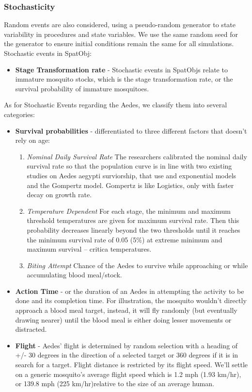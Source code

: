 \subsubsection{Stochasticity}
    Random events are also considered, using a pseudo-random generator to state variability in procedures and state variables. We use the same random seed for the generator to ensure initial conditions remain the same for all simulations.
Stochastic events in SpatObj:
\begin{itemize}

\item \textbf{Stage Transformation rate} - Stochastic events in SpatObjs relate to immature mosquito stocks, which is the stage transformation rate, or the survival probability of immature mosquitoes.

\end{itemize}
As for Stochastic Events regarding the Aedes, we classify them into several categories:
\begin{itemize}

\item \textbf{Survival probabilities} - differentiated to three different factors that doesn't rely on age:
\begin{enumerate}
		\item \textit{Nominal Daily Survival Rate}
			The researchers calibrated the nominal daily survival rate so that the population curve is in line with two existing studies on Aedes aegypti surviorship, that use and exponential models and the Gompertz model\cite{yang}. Gompertz is like Logistics, only with faster decay on growth rate. 
			
		\item \textit{Temperature Dependent} 
             For each stage, the minimum and maximum threshold temperatures are given for maximum survival rate. Then this probability decreases linearly beyond the two thresholds until it reaches the minimum survival rate of 0.05 (5\%) at extreme minimum and maximum survival – critica temperatures\cite{skeeter}.
        
		\item \textit{Biting Attempt}
			Chance of the Aedes to survive while approaching or while accumulating blood meal/stock.
\end{enumerate}

	\item \textbf{Action Time} - or the duration of an Aedes in attempting the activity to be done and its completion time. For illustration, the mosquito wouldn't directly approach a blood meal target, instead, it will fly randomly (but eventually drawing nearer) until the blood meal is either doing lesser movements or distracted.
    
    \item	\textbf{Flight} - Aedes' flight is determined by random selection with a heading of +/- 30 degrees in the direction of a selected target or 360 degrees if it is in search for a target. Flight distance is restricted by its flight speed. We'll settle on a generic mosquito's average flight speed which is 1.2 mph (1.93 km/hr), or 139.8 mph (225 km/hr)relative to the size of an average human.\cite{speed}
\end{itemize}

